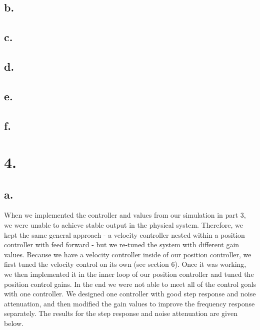 \documentclass{article}
\theoremstyle{plain}
\theoremstyle{definition}
\theoremstyle{remark}
\begin{document}
\subsection*{b.}

\subsection*{c.}

\subsection*{d.}

\subsection*{e.}

\subsection*{f.}

\clearpage

\section*{4.}

\subsection*{a.}
When we implemented the controller and values from our simulation in part 3, we were unable to achieve stable output in the physical system. Therefore, we kept the same general approach - a velocity controller nested within a position controller with feed forward - but we re-tuned the system with different gain values. Because we have a velocity controller inside of our position controller, we first tuned the velocity control on its own (see section 6). Once it was working, we then implemented it in the inner loop of our position controller and tuned the position control gains. In the end we were not able to meet all of the control goals with one controller. We designed one controller with good step response and noise attenuation, and then modified the gain values to improve the frequency response separately. The results for the step response and noise attenuation are given below.\\
\end{document}
